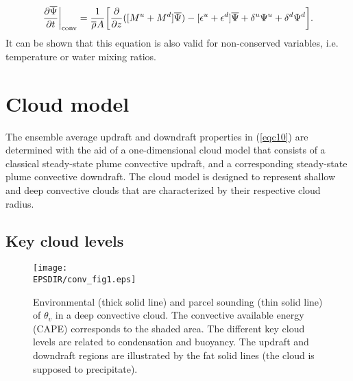 \begin{eqnarray}
{\partial\overline{\Psi}\over\partial t}\bigg\vert_{\rm conv} =
{1\over\overline{\rho}^{} A }\bigg[{\partial\over\partial z}(
[ M^{u}+ M^{d}]\overline{\Psi}) -
[\epsilon^u+\epsilon^d]\overline{\Psi}+
\delta^u \Psi^{u}+\delta^d \Psi^{d}\bigg].
\label{eqc10}
\end{eqnarray}
It can be shown that this equation is also valid for non-conserved
variables, i.e. temperature or water mixing ratios.

\section{Cloud model}

The ensemble average updraft and downdraft properties in
(\ref{eqc10}) are determined with the aid of a one-dimensional cloud model
that consists of a classical
steady-state plume convective updraft, and a corresponding
steady-state plume convective downdraft.
The cloud model is designed to represent shallow
and deep convective clouds that are characterized by their respective
cloud radius.


\subsection{Key cloud levels}

\begin{figure}
\centerline{\texttt{[image: \\EPSDIR/conv\_fig1.eps]}}
\caption{Environmental (thick solid line) and parcel sounding (thin solid line)
of $\theta_v$ in a deep convective cloud. The convective available
energy (CAPE) corresponds to the shaded area. The different key cloud
levels are related to condensation and buoyancy. The updraft and downdraft
regions are illustrated by the fat solid lines (the cloud is supposed
to precipitate).}
\label{conv_fig1}
\end{figure}

